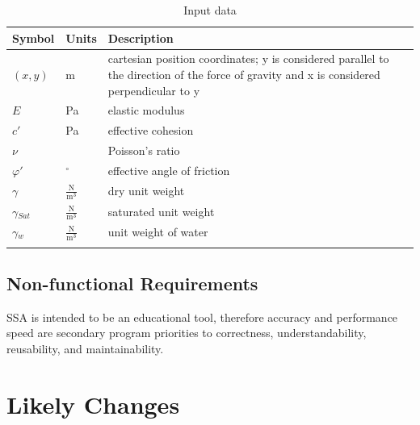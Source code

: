 \documentclass[12pt]{article}
\begin{document}
\begin{longtable}{l l l}
\toprule
Symbol & Units & Description
\\
\midrule
$(x,y)$ & m & cartesian position coordinates; y is considered parallel to the direction of the force of gravity and x is considered perpendicular to y
\\
$E$ & Pa & elastic modulus
\\
$c'$ & Pa & effective cohesion
\\
$\nu{}$ &  & Poisson's ratio
\\
$\varphi{}'$ & ${}^{\circ}$ & effective angle of friction
\\
$\gamma{}$ & $\frac{\text{N}}{\text{m}^{3}}$ & dry unit weight
\\
$\gamma{}_{Sat}$ & $\frac{\text{N}}{\text{m}^{3}}$ & saturated unit weight
\\
$\gamma{}_{w}$ & $\frac{\text{N}}{\text{m}^{3}}$ & unit weight of water
\\
\bottomrule
\caption{Input data}
\label{Table:Id}
\end{longtable}
\subsection{Non-functional Requirements}
\label{Sec:NR}
SSA is intended to be an educational tool, therefore accuracy and performance speed are secondary program priorities to correctness, understandability, reusability, and maintainability.
\section{Likely Changes}
\label{Sec:LC}
\end{document}
